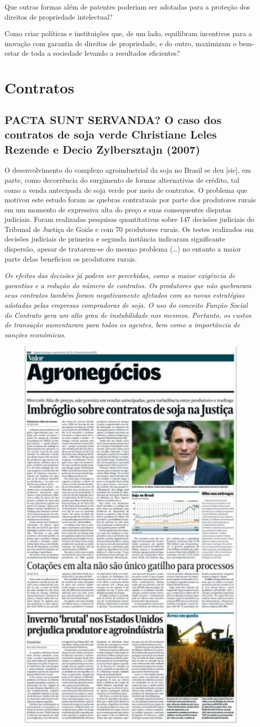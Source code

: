 \documentclass[a4paper,12pt]{article}[abntex2]
\begin{document}
Que outras formas além de patentes poderiam ser adotadas para a proteção dos direitos de propriedade intelectual?

Como criar políticas e instituições que, de um lado, equilibram incentivos para a inovação com garantia de direitos de propriedade, e do outro, maximizam o bem-estar de toda a sociedade levando a resultados eficientes?

\newpage
\section{\textbf{Contratos}}
\subsection{\textbf{PACTA SUNT SERVANDA? O caso dos contratos de soja verde Christiane Leles Rezende e Decio Zylbersztajn (2007)}}

O desenvolvimento do complexo agroindustrial da soja no Brasil se deu [sic], em parte, como decorrência do surgimento de formas alternativas de crédito, tal como a venda antecipada de soja verde por meio de contratos. O problema que motivou este estudo foram as quebras contratuais por parte dos produtores rurais em um momento de expressiva alta do preço e suas consequentes disputas judiciais. Foram realizadas pesquisas quantitativas sobre 147 decisões judiciais do Tribunal de Justiça de Goiás e com 70 produtores rurais. Os testes realizados em decisões judiciais de primeira e segunda instância indicaram significante dispersão, apesar de tratarem-se do mesmo problema (…) no entanto a maior parte delas beneficiou os produtores rurais. 

\textit{Os efeitos das decisões já podem ser percebidos, como a maior exigência de garantias e a redução do número de contratos. Os produtores que não quebraram seus contratos também foram negativamente afetados com as novas estratégias adotadas pelas empresas compradoras de soja. O uso do conceito Função Social do Contrato gera um alto grau de instabilidade nos mesmos. Portanto, os custos de transação aumentaram para todos os agentes, bem como a importância de sanções econômicas.}

\begin{figure}[H]
    \centering
    \includegraphics[width=0.4\linewidth]{Imagens/a10i1.png}
\end{figure}
\end{document}
